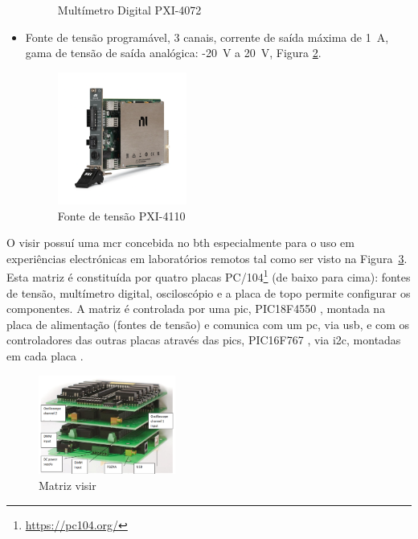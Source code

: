 \begin{itemize}
\begin{figure}[hbtp]
              \caption{Multímetro Digital PXI-4072 \cite{PXI-4072}}
              \label{fig:PXI-4072}
          \end{figure}
    \item Fonte de tensão programável, 3 canais, corrente de saída máxima de \SI{1}{\ampere}, gama de tensão de saída analógica: -\SI{20}{\volt} a \SI{20}{\volt}, Figura {\ref{fig:PXI-4110}}.
          \begin{figure}[hbtp]
              \centering
              \includegraphics[width=0.4\textwidth]{figures/PXI-4110.png}
              \caption{Fonte de tensão PXI-4110 \cite{PXI-4110}}
              \label{fig:PXI-4110}
          \end{figure}
\end{itemize}

O \acrshort{visir} possuí uma \acrfull{mcr} concebida no \acrshort{bth} especialmente para o uso em experiências electrónicas em laboratórios remotos tal como ser visto na Figura~\ref{fig:matrizvisir}. Esta matriz é constituída por quatro placas PC/104\footnote{\url{https://pc104.org/}} (de baixo para cima): fontes de tensão, multímetro digital, osciloscópio e a placa de topo permite configurar os componentes. A matriz é controlada por uma \acrfull{pic}, PIC18F4550 \cite{PIC18F4516datasheet}, montada na placa de alimentação (fontes de tensão) e comunica com um \acrshort{pc}, via \acrshort{usb}, e com os controladores das outras placas através das \acrshort{pic}s, PIC16F767 \cite{PIC16F7675datasheet}, via \acrfull{i2c}, montadas em cada placa \cite{matriz}.

\begin{figure}[hbtp]
    \centering
    \includegraphics[width=0.4\textwidth]{figures/matriz.png}
    \caption{Matriz \acrshort{visir}\cite{matriz}}
    \label{fig:matrizvisir}
\end{figure}

